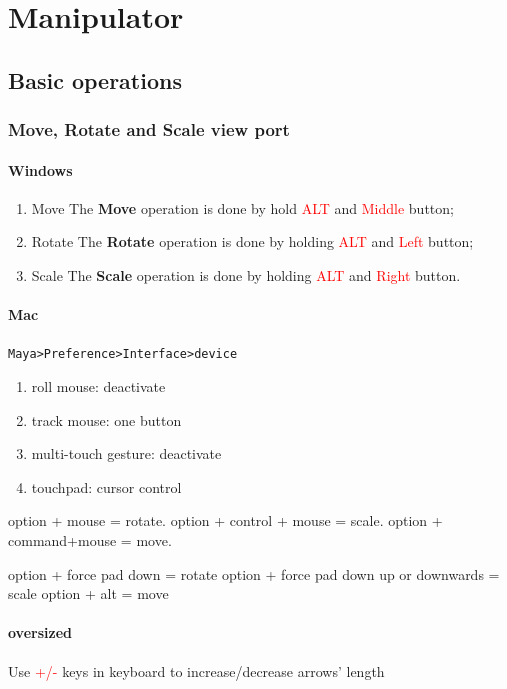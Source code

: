 
\chapter{Manipulator}

\section{Basic operations}

\subsection{Move, Rotate and Scale view port}

\subsubsection{Windows}
\begin{enumerate}
	\item Move
	The \textbf{Move} operation is done by hold \textcolor{red}{ALT} and \textcolor{red}{Middle} button;
	\item Rotate
	The \textbf{Rotate} operation is done by holding \textcolor{red}{ALT} and \textcolor{red}{Left} button;
	\item Scale
	The \textbf{Scale} operation is done by holding \textcolor{red}{ALT} and \textcolor{red}{Right} button.		
\end{enumerate}

\subsubsection{Mac}
\lstinline{Maya>Preference>Interface>device}
\begin{enumerate}
	\item roll mouse: deactivate
	\item track mouse: one button
	\item multi-touch gesture: deactivate
	\item touchpad: cursor control
\end{enumerate}

option + mouse = rotate.
option + control + mouse = scale.
option + command+mouse = move.

option + force pad down = rotate
option + force pad down up or downwards = scale
option + alt = move

\subsubsection{oversized}
Use \textcolor{red}{+/-} keys in keyboard to increase/decrease arrows' length 

